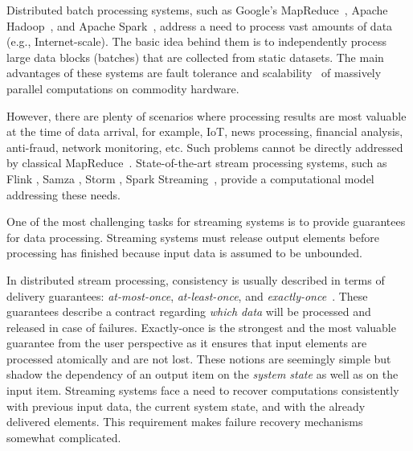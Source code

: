 
\label {fs-intro-seciton}

Distributed batch processing systems, such as Google's MapReduce~\cite{Dean:2008:MSD:1327452.1327492}, Apache Hadoop~\cite{hadoop2009hadoop}, and Apache Spark~\cite{Zaharia:2016:ASU:3013530.2934664}, address a need to process vast amounts of data (e.g., Internet-scale). 
The basic idea behind them is to independently process large data blocks (batches) that are collected from static datasets. 
The main advantages of these systems are fault tolerance and scalability~\cite{borthakur2011apache} of massively parallel computations on commodity hardware.

However, there are plenty of scenarios where processing results are most valuable at the time of data arrival, for example, IoT, news processing, financial analysis, anti-fraud, network monitoring, etc. 
Such problems cannot be directly addressed by classical MapReduce~\cite{Doulkeridis:2014:SLA:2628707.2628782}. 
State-of-the-art stream processing systems, such as Flink \cite{carbone2015apache}, Samza \cite{Noghabi:2017:SSS:3137765.3137770}, Storm \cite{apache:storm}, Spark Streaming~\cite{Zaharia:2012:DSE:2342763.2342773},   provide a computational model addressing these needs.

One of the most challenging tasks for streaming systems is to provide guarantees for data processing. 
Streaming systems must release output elements before processing has finished because input data is assumed to be unbounded. 

In distributed stream processing, consistency is usually described in terms of delivery guarantees: {\em at-most-once}, {\em at-least-once}, and {\em exactly-once}~\cite{carbone2015apache}. 
These guarantees describe a contract regarding {\em which data} will be processed and released in case of failures. 
Exactly-once is the strongest and the most valuable guarantee from the user perspective as it ensures that input elements are processed atomically and are not lost. These notions are seemingly simple but shadow the dependency of an output item on the {\em system state} as well as on the input item. 
Streaming systems face a need to recover computations consistently with previous input data, the current system state, and with the already delivered elements.
This requirement makes failure recovery mechanisms somewhat complicated. 

